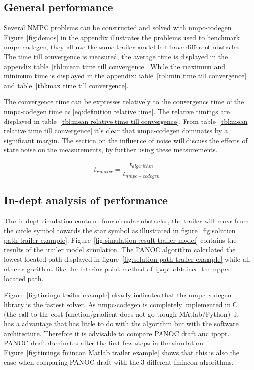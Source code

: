 \subsection{General performance}
Several NMPC problems can be constructed and solved with nmpc-codegen. Figure~\ref{fig:demos} in the appendix illustrates the problems used to benchmark nmpc-codegen, they all use the same trailer model but have different obstacles. The time till convergence is measured, the average time is displayed in the appendix table~\ref{tbl:mean time till convergence}. While the maximum and minimum time is displayed in the appendix: table~\ref{tbl:min time till convergence} and table~\ref{tbl:max time till convergence}.

The convergence time can be expresses relatively to the convergence time of the nmpc-codegen time as \eqref{eq:definition relative time}. The relative timings are displayed in table~\ref{tbl:mean relative time till convergence}. From table~\ref{tbl:mean relative time till convergence} it's clear that nmpc-codegen dominates by a significant margin. The section on the influence of noise will discuss the effects of state noise on the measurements, by further using these measurements.

\begin{equation}
	t_{relative} = \frac{t_{algorithm}}{t_{nmpc-codegen}}
	\label{eq:definition relative time}
\end{equation}

\subsection{In-dept analysis of performance}
The in-dept simulation contains four circular obstacles, the trailer will move from the circle symbol towards the star symbol as illustrated in figure~\ref{fig:solution path trailer example}. Figure~\ref{fig:simulation result trailer model} contains the results of the trailer model simulation. The PANOC algorithm calculated the lowest located path displayed in figure~\ref{fig:solution path trailer example} while all other algorithms like the interior point method of ipopt obtained the upper located path.

Figure~\ref{fig:timings trailer example} clearly indicates that the nmpc-codegen library is the fastest solver. As nmpc-codegen is completely implemented in C (the call to the cost function/gradient does not go trough MAtlab/Python), it has a advantage that has little to do with the algorithm but with the software architecture. Therefore it is advisable to compare PANOC draft and ipopt. PANOC draft dominates after the first few steps in the simulation. Figure~\ref{fig:timings fmincon Matlab trailer example} shows that this is also the case when comparing PANOC draft with the 3 different fmincon algorithms.

